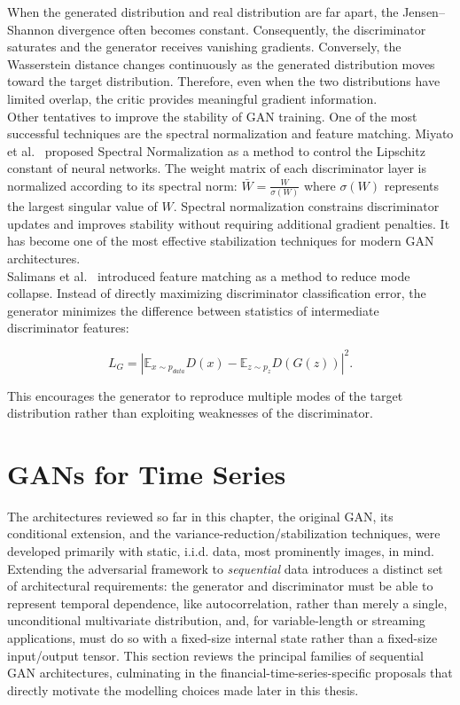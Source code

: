 When the generated distribution and real distribution are far apart, the
Jensen--Shannon divergence often becomes constant.
Consequently, the discriminator saturates and the generator receives
vanishing gradients. Conversely, the Wasserstein distance changes continuously as the generated
distribution moves toward the target distribution.
Therefore, even when the two distributions have limited overlap, the critic
provides meaningful gradient information.\\

Other tentatives to improve the stability of GAN training. One of the most successful techniques are the spectral normalization and feature matching.
Miyato et al.~\cite{background:spectral_norm} proposed Spectral Normalization as a method to
control the Lipschitz constant of neural networks. The weight matrix of each discriminator layer is normalized according to its
spectral norm: $\bar{W}=\frac{W}{\sigma(W)}$
where $\sigma(W)$ represents the largest singular value of $W$.
Spectral normalization constrains discriminator updates and improves
stability without requiring additional gradient penalties.
It has become one of the most effective stabilization techniques for modern
GAN architectures.\\

Salimans et al.~\cite{background:feature_matching} introduced feature matching as a method to
reduce mode collapse. Instead of directly maximizing discriminator classification error, the
generator minimizes the difference between statistics of intermediate
discriminator features:

\begin{equation*}
L_G
=
\left|
\mathbb{E}_{x\sim p_{data}}D(x)
-
\mathbb{E}_{z\sim p_z}D(G(z))
\right|^2 .
\end{equation*}

This encourages the generator to reproduce multiple modes of the target
distribution rather than exploiting weaknesses of the discriminator.


\section{GANs for Time Series}
The architectures reviewed so far in this chapter, 
the original GAN, its conditional extension, and the variance-reduction/stabilization techniques, were developed 
primarily with static, i.i.d. data, most prominently images, in mind. 
Extending the adversarial framework to \emph{sequential} data introduces a distinct
set of architectural requirements: 
the generator and discriminator must be able to represent
temporal dependence, like autocorrelation, rather than merely a single, 
unconditional multivariate distribution, and, for variable-length or streaming applications, 
must do so with a fixed-size internal state rather than a fixed-size input/output tensor. 
This section reviews the principal families of sequential GAN architectures, 
culminating in the financial-time-series-specific 
proposals that directly motivate the modelling choices made later in this thesis.\\

